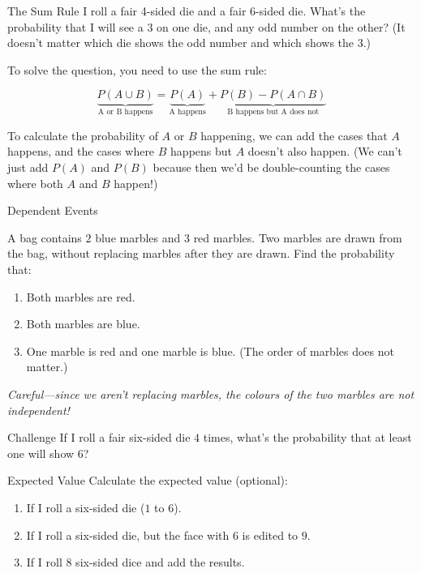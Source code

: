 \documentclass[12pt,letterpaper]{article}
\begin{document}
\begin{problem}{The Sum Rule}
 I roll a fair 4-sided die and a fair 6-sided die. What's the probability that I
 will see a $3$ on one die, and any odd number on the other? (It doesn't matter
 which die shows the odd number and which shows the $3$.)

 To solve the question, you need to use the sum rule:

 \begin{equation*}
  \underbrace{P(A \cup B)}_\text{A or B happens}
  = \underbrace{P(A)}_\text{A happens} + \underbrace{P(B) -
  P(A \cap B)}_\text{B happens but A does not}
 \end{equation*}

 To calculate the probability of $A$ or $B$ happening, we can add the cases that
 $A$ happens, and the cases where $B$ happens but $A$ doesn't also happen. (We
 can't just add $P(A)$ and $P(B)$ because then we'd be double-counting the cases
 where both $A$ and $B$ happen!)
\end{problem}

\begin{problem}{Dependent Events}

 A bag contains $2$ blue marbles and $3$ red marbles. Two marbles are drawn from
 the bag, without replacing marbles after they are drawn. Find the probability
 that:

 \begin{enumerate}[\hspace{.5cm}a.]
  \item Both marbles are red.
  \item Both marbles are blue.
  \item One marble is red and one marble is blue. (The order of marbles does not
  matter.)
 \end{enumerate}

 \emph{Careful---since we aren't replacing marbles, the colours of the two
 marbles are not independent!}
\end{problem}

\begin{problem}{Challenge}
 If I roll a fair six-sided die $4$ times, what's the probability that at least
 one will show $6$?
\end{problem}

\begin{problem}{Expected Value}
Calculate the expected value (optional):

 \begin{enumerate}[\hspace{.5cm}a.]
  \item If I roll a six-sided die ($1$ to $6$).
  \item If I roll a six-sided die, but the face with $6$ is edited to $9$.
  \item If I roll $8$ six-sided dice and add the results.
 \end{enumerate}
\end{problem}
\end{document}
